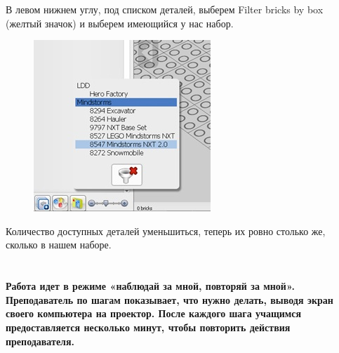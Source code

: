 В левом нижнем углу, под списком деталей, выберем Filter bricks by box (желтый значок) и выберем имеющийся у нас набор.
\begin{figure}[h!]
	\begin{center}
		\includegraphics[width=0.65\linewidth]{chapters/chapter3/images/4}
		\caption{}
		\label{ris:image3x4}
	\end{center}
\end{figure}	

Количество доступных деталей уменьшиться, теперь их ровно столько же, сколько в нашем наборе.\\

{\hypertarget{lesson3x3}{}}\\\\

{\bfseries Работа идет в режиме «наблюдай за мной, повторяй за мной». Преподаватель по шагам показывает, что нужно делать, выводя экран своего компьютера на проектор. После каждого шага учащимся предоставляется несколько минут, чтобы повторить действия преподавателя.}


